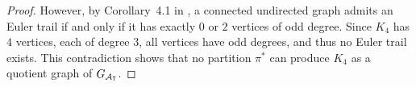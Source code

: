 \documentclass[letterpaper,11pt]{article}
\newcommand{\Lin}[1]{{\color{purple}{Lin: #1}}}
\def\Einsum{\textsc{Einsum}}
\newcommand{\libref}[2]{\href{#2}{\texttt{#1}}}
\newcommand{\completegraphp}[1]{K_{#1}}
\newcommand{\graphform}[1]{G_{#1}}
\def\package{\libref{u-stats}{https://github.com/zrq1706/U-Statistics-Python}}
\begin{document}
\begin{bibunit}[plainnat]
\begin{proof}
However, by Corollary~4.1 in \citet{bondy1976graph},  
a connected undirected graph admits an Euler trail if and only if it has exactly $0$ or $2$ vertices of odd degree.  
Since $\completegraphp{4}$ has $4$ vertices, each of degree $3$, all vertices have odd degrees, and thus no Euler trail exists.  
This contradiction shows that no partition $\pi^*$ can produce $\completegraphp{4}$ as a quotient graph of $\graphform{\calA_7}$.
\end{proof}





\putbib[\myreferencesapp]
\end{bibunit}
\end{document}
